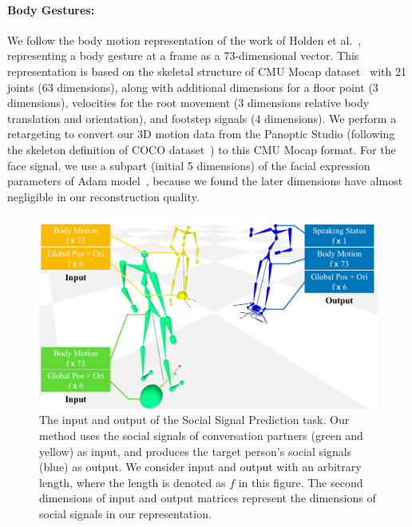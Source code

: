 \paragraph{Body Gestures:} We follow the body motion representation of the work of Holden et al.~\cite{holden2016deep}, representing a body gesture at a frame as a 73-dimensional vector. This representation is based on the skeletal structure of CMU Mocap dataset~\cite{gross2001cmu} with 21 joints (63 dimensions), along with additional dimensions for a floor point (3 dimensions), velocities for the root movement (3 dimensions relative body translation and orientation), and footstep signals (4 dimensions). We perform a retargeting to convert our 3D motion data from the Panoptic Studio (following the skeleton definition of COCO dataset~\cite{coco-14}) to this CMU Mocap format. For the face signal, we use a subpart (initial 5 dimensions) of the facial expression parameters of Adam model~\cite{joo2018,cao2014facewarehouse}, because we found the later dimensions have almost negligible in our reconstruction quality.

\begin{figure}[t]		
	\includegraphics[width=\linewidth]{ssp_fig/Input_output.pdf}
	\caption{The input and output of the Social Signal Prediction task. Our method uses the social signals of conversation partners (green and yellow) as input, and produces the target person's social signals (blue) as output. We consider input and output with an arbitrary length, where the length is denoted as $f$ in this figure. The second dimensions of input and output matrices represent the dimensions of social signals in our representation.}
	\label{fig:inputOutput}
\end{figure}

